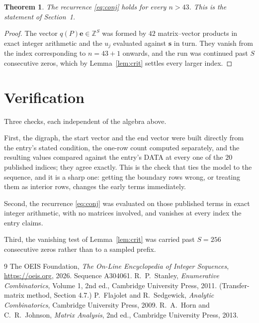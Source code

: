 \documentclass[11pt,a4paper]{article}
\theoremstyle{plain}
\newtheorem{theorem}{Theorem}
\theoremstyle{definition}
\begin{document}
\begin{theorem}
The recurrence \eqref{eq:conj} holds for every $n>43$. This is the statement of
Section~1.
\end{theorem}

\begin{proof}
The vector $q(P)\mathbf{e}\in\mathbb{Z}^{S}$ was formed by $42$ matrix--vector
products in exact integer arithmetic and the $u_j$ evaluated against $\mathbf{s}$ in turn.
They vanish from the index corresponding to $n=43+1$ onwards, and the run was continued
past $S$ consecutive zeros, which by Lemma~\ref{lem:crit} settles every larger index.
\end{proof}

\section{Verification}

Three checks, each independent of the algebra above.

First, the digraph, the start vector and the end vector were built directly from the
entry's stated condition, the one-row count computed separately, and the resulting values
compared against the entry's DATA at every one of the $20$ published indices; they
agree exactly. This is the check that ties the model to the sequence, and it is a sharp one:
getting the boundary rows wrong, or treating them as interior rows, changes the early terms
immediately.

Second, the recurrence \eqref{eq:conj} was evaluated on those published terms in exact
integer arithmetic, with no matrices involved, and vanishes at every index the entry claims.

Third, the vanishing test of Lemma~\ref{lem:crit} was carried past $S=256$ consecutive
zeros rather than to a sampled prefix.

\begin{thebibliography}{9}
 The OEIS Foundation, \emph{The On-Line Encyclopedia of Integer
Sequences}, \url{https://oeis.org}, 2026. Sequence A304061.
 R.~P.~Stanley, \emph{Enumerative Combinatorics}, Volume 1, 2nd ed.,
Cambridge University Press, 2011. (Transfer-matrix method, Section 4.7.)
 P.~Flajolet and R.~Sedgewick, \emph{Analytic Combinatorics}, Cambridge
University Press, 2009.
 R.~A.~Horn and C.~R.~Johnson, \emph{Matrix Analysis}, 2nd ed., Cambridge
University Press, 2013.
\end{thebibliography}
\end{document}

